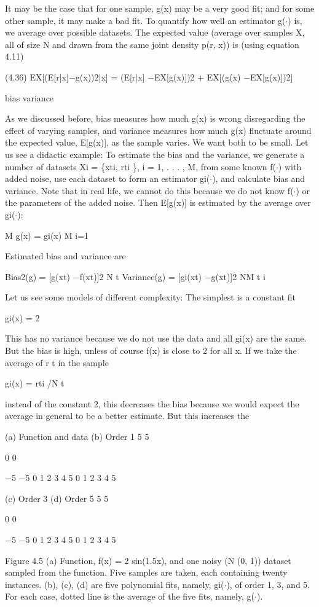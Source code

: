 It may be the case that for one sample, g(x) may be a very good fit; and for some other sample, it may make a bad fit. To quantify how well an estimator g($\cdot$) is, we average over possible datasets. The expected value (average over samples X, all of size N and drawn from the same joint density p(r, x)) is (using equation 4.11)

(4.36) EX[(E[r|x]$-$g(x))2|x] = (E[r|x] $-$EX[g(x)])2 + EX[(g(x) $-$EX[g(x)])2]

bias variance

As we discussed before, bias measures how much g(x) is wrong disregarding the effect of varying samples, and variance measures how much g(x) fluctuate around the expected value, E[g(x)], as the sample varies. We want both to be small. Let us see a didactic example: To estimate the bias and the variance, we generate a number of datasets Xi = \{xti, rti \}, i = 1, . . . , M, from some known f($\cdot$) with added noise, use each dataset to form an estimator gi($\cdot$), and calculate bias and variance. Note that in real life, we cannot do this because we do not know f($\cdot$) or the parameters of the added noise. Then E[g(x)] is estimated by the average over gi($\cdot$):

M g(x) = gi(x) M i=1

Estimated bias and variance are

Bias2(g) = [g(xt) $-$f(xt)]2 N t Variance(g) = [gi(xt) $-$g(xt)]2 NM t i

Let us see some models of different complexity: The simplest is a constant fit

gi(x) = 2

This has no variance because we do not use the data and all gi(x) are the same. But the bias is high, unless of course f(x) is close to 2 for all x. If we take the average of r t in the sample

gi(x) = rti /N t

instead of the constant 2, this decreases the bias because we would expect the average in general to be a better estimate. But this increases the

(a) Function and data (b) Order 1 5 5

0 0

$-$5 $-$5 0 1 2 3 4 5 0 1 2 3 4 5

(c) Order 3 (d) Order 5 5 5

0 0

$-$5 $-$5 0 1 2 3 4 5 0 1 2 3 4 5

Figure 4.5 (a) Function, f(x) = 2 sin(1.5x), and one noisy (N (0, 1)) dataset sampled from the function. Five samples are taken, each containing twenty instances. (b), (c), (d) are five polynomial fits, namely, gi($\cdot$), of order 1, 3, and 5. For each case, dotted line is the average of the five fits, namely, g($\cdot$).

